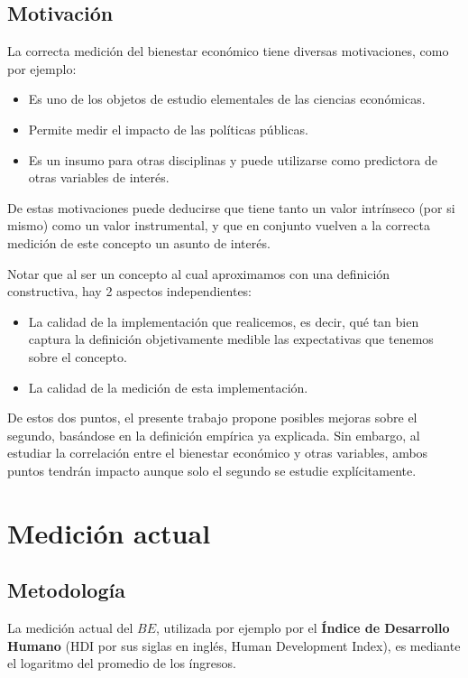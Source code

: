 \subsection{Motivación}

La correcta medición del bienestar económico tiene diversas motivaciones, como por ejemplo:

\begin{itemize}
    \item Es uno de los objetos de estudio elementales de las ciencias económicas.
    \item Permite medir el impacto de las políticas públicas.
    \item Es un insumo para otras disciplinas y puede utilizarse como predictora de otras variables de interés.
\end{itemize}

De estas motivaciones puede deducirse que tiene tanto un valor intrínseco (por si mismo) como un valor instrumental, y que en conjunto vuelven a la correcta medición de este concepto un asunto de interés.

Notar que al ser un concepto al cual aproximamos con una definición constructiva, hay 2 aspectos independientes:

\begin{itemize}
    \item La calidad de la implementación que realicemos, es decir, qué tan bien captura la definición objetivamente medible las expectativas que tenemos sobre el concepto.
    \item La calidad de la medición de esta implementación.
\end{itemize}

De estos dos puntos, el presente trabajo propone posibles mejoras sobre el segundo, basándose en la definición empírica ya explicada. Sin embargo, al estudiar la correlación entre el bienestar económico y otras variables, ambos puntos tendrán impacto aunque solo el segundo se estudie explícitamente.

\section{Medición actual}

\subsection{Metodología}

La medición actual del $BE$, utilizada por ejemplo por el \textbf{Índice de Desarrollo Humano} \cite{undp2023tech_notes} (HDI por sus siglas en inglés, Human Development Index), es mediante el logaritmo del promedio de los íngresos.

